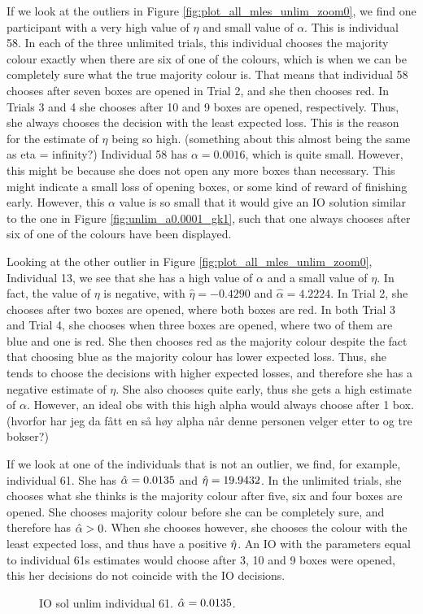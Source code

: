  
If we look at the outliers in Figure \ref{fig:plot_all_mles_unlim_zoom0}, we find one participant with a very high value of $\eta$ and small value of $\alpha$. This is individual 58. In each of the three unlimited trials, this individual chooses the majority colour exactly when there are six of one of the colours, which is when we can be completely sure what the true majority colour is. That means that individual 58 chooses after seven boxes are opened in Trial 2, and she then chooses red. In Trials 3 and 4 she chooses after 10 and 9 boxes are opened, respectively. Thus, she always chooses the decision with the least expected loss. This is the reason for the estimate of $\eta$ being so high. (something about this almost being the same as eta = infinity?) Individual 58 has $\alpha=0.0016$, which is quite small. However, this might be because she does not open any more boxes than necessary. This might indicate a small loss of opening boxes, or some kind of reward of finishing early. However, this $\alpha$ value is so small that it would give an IO solution similar to the one in Figure \ref{fig:unlim_a0.0001_gk1}, such that one always chooses after six of one of the colours have been displayed. 

Looking at the other outlier in Figure \ref{fig:plot_all_mles_unlim_zoom0}, Individual 13, we see that she has a high value of $\alpha$ and a small value of $\eta$. In fact, the value of $\eta$ is negative,  with $\hat{\eta}=-0.4290$ and $\hat{\alpha}=4.2224$. In Trial 2, she chooses after two boxes are opened, where both boxes are red. In both Trial 3 and Trial 4, she chooses when three boxes are opened, where two of them are blue and one is red. She then chooses red as the majority colour despite the fact that choosing blue as the majority colour has lower expected loss. Thus, she tends to choose the decisions with higher expected losses, and therefore she has a negative estimate of $\eta$. She also chooses quite early, thus she gets a high estimate of $\alpha$. However, an ideal obs with this high alpha would always choose after 1 box. (hvorfor har jeg da fått en så høy alpha når denne personen velger etter to og tre bokser?)


If we look at one of the individuals that is not an outlier, we find, for example, individual 61. She has $\hat{\alpha}=0.0135$ and $\hat{\eta}=19.9432$. In the unlimited trials, she chooses what she thinks is the majority colour after five, six and four boxes are opened. She chooses majority colour before she can be completely sure, and therefore has $\hat{\alpha}>0$. When she chooses however, she chooses the colour with the least expected loss, and thus have a positive $\hat{\eta}$. An IO with the parameters equal to individual 61s estimates would choose after 3, 10 and 9 boxes were opened, this her decisions do not coincide with the IO decisions. 
\begin{figure}
    \centering
    \scalebox{0.7}{}
    \caption{IO sol unlim individual 61. $\hat{\alpha}=0.0135$.}
    \label{fig:IO_sol_individual61}
\end{figure}





